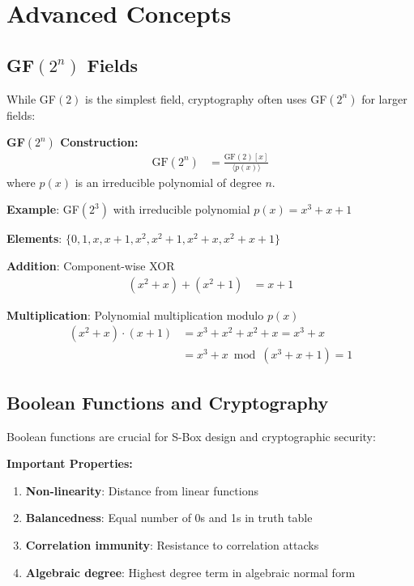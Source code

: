 \documentclass[11pt,a4paper]{article}
\begin{document}
\section{Advanced Concepts}

\subsection{GF$(2^n)$ Fields}

While GF$(2)$ is the simplest field, cryptography often uses GF$(2^n)$ for larger fields:

\begin{theorybox}
\textbf{GF$(2^n)$ Construction:}
\begin{align*}
\text{GF}(2^n) &= \frac{\text{GF}(2)[x]}{\langle p(x) \rangle}
\end{align*}
where $p(x)$ is an irreducible polynomial of degree $n$.
\end{theorybox}

\begin{examplebox}
\textbf{Example}: GF$(2^3)$ with irreducible polynomial $p(x) = x^3 + x + 1$

\textbf{Elements}: $\{0, 1, x, x+1, x^2, x^2+1, x^2+x, x^2+x+1\}$

\textbf{Addition}: Component-wise XOR
\begin{align*}
(x^2 + x) + (x^2 + 1) &= x + 1
\end{align*}

\textbf{Multiplication}: Polynomial multiplication modulo $p(x)$
\begin{align*}
(x^2 + x) \cdot (x + 1) &= x^3 + x^2 + x^2 + x = x^3 + x \\
&= x^3 + x \bmod (x^3 + x + 1) = 1
\end{align*}
\end{examplebox}

\subsection{Boolean Functions and Cryptography}

Boolean functions are crucial for S-Box design and cryptographic security:

\begin{theorybox}
\textbf{Important Properties:}
\begin{enumerate}
    \item \textbf{Non-linearity}: Distance from linear functions
    \item \textbf{Balancedness}: Equal number of 0s and 1s in truth table
    \item \textbf{Correlation immunity}: Resistance to correlation attacks
    \item \textbf{Algebraic degree}: Highest degree term in algebraic normal form
\end{enumerate}
\end{theorybox}
\end{document}
